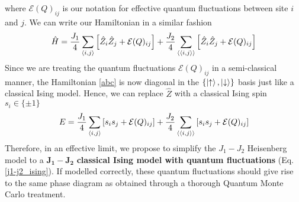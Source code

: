 \documentclass[../journal_main.tex]{subfiles}
\begin{document}
where $\mathcal{E}(Q)_{ij}$ is our notation for effective quantum fluctuations between site $i$ and $j$. We can write our Hamiltonian in a similar fashion
\begin{equation}
    \hat{H} = \frac{J_1}{4} \sum_{\expval{i,j}} \qty[\hat{Z}_i \hat{Z}_j + \mathcal{E}(Q)_{ij}] + \frac{J_2}{4} \sum_{\expval{\expval{i,j}}} \qty[\hat{Z}_i \hat{Z}_j + \mathcal{E}(Q)_{ij}]
    \label{abc}
\end{equation}
Since we are treating the quantum fluctuations $\mathcal{E}(Q)_{ij}$ in a semi-classical manner, the Hamiltonian \eqref{abc} is now diagonal in the $\{\ket{\uparrow}, \ket{\downarrow} \}$ basis just like a classical Ising model. Hence, we can replace $\hat{Z}$ with a classical Ising spin $s_i \in \{\pm 1\}$  
\begin{equation}
    E = \frac{J_1}{4} \sum_{\expval{i,j}} \qty[s_i s_j + \mathcal{E}(Q)_{ij}] + \frac{J_2}{4} \sum_{\expval{\expval{i,j}}} \qty[s_i s_j + \mathcal{E}(Q)_{ij}]
    \label{j1-j2_ising}
\end{equation}
Therefore, in an effective limit, we propose to simplify the $J_1 - J_2$ Heisenberg model to a $\boldsymbol{J_1 - J_2}$ \textbf{classical Ising model with quantum fluctuations} (Eq. \eqref{j1-j2_ising}). If modelled correctly, these quantum fluctuations should give rise to the same phase diagram as obtained through a thorough Quantum Monte Carlo treatment.
\end{document}
